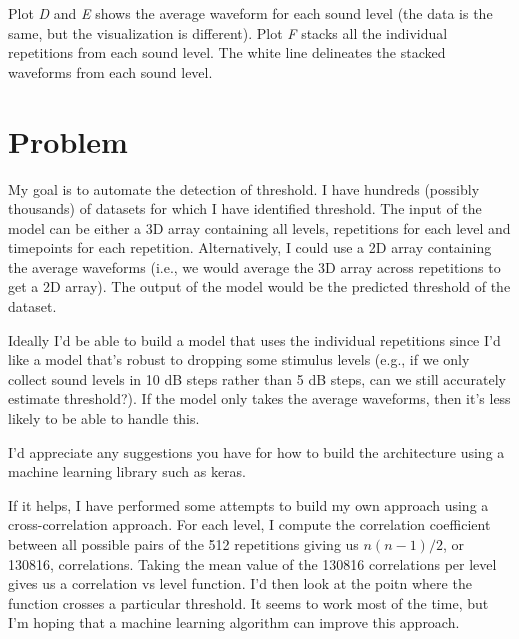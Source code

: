 \documentclass[11pt]{article}
\begin{document}
Plot \emph{D} and \emph{E} shows the average waveform for each sound
level (the data is the same, but the visualization is different). Plot
\emph{F} stacks all the individual repetitions from each sound level.
The white line delineates the stacked waveforms from each sound level.

\section{Problem}\label{problem}

My goal is to automate the detection of threshold. I have hundreds
(possibly thousands) of datasets for which I have identified threshold.
The input of the model can be either a 3D array containing all levels,
repetitions for each level and timepoints for each repetition.
Alternatively, I could use a 2D array containing the average waveforms
(i.e., we would average the 3D array across repetitions to get a 2D
array). The output of the model would be the predicted threshold of the
dataset.

Ideally I'd be able to build a model that uses the individual
repetitions since I'd like a model that's robust to dropping some
stimulus levels (e.g., if we only collect sound levels in 10 dB steps
rather than 5 dB steps, can we still accurately estimate threshold?). If
the model only takes the average waveforms, then it's less likely to be
able to handle this.

I'd appreciate any suggestions you have for how to build the
architecture using a machine learning library such as keras.

    If it helps, I have performed some attempts to build my own approach
using a cross-correlation approach. For each level, I compute the
correlation coefficient between all possible pairs of the 512
repetitions giving us \(n(n-1)/2\), or 130816, correlations. Taking the
mean value of the 130816 correlations per level gives us a correlation
vs level function. I'd then look at the poitn where the function crosses
a particular threshold. It seems to work most of the time, but I'm
hoping that a machine learning algorithm can improve this approach.
\end{document}
